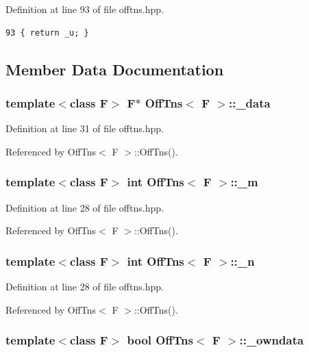 Definition at line 93 of file offtns.hpp.

\footnotesize\begin{verbatim}93 { return _u; }
\end{verbatim}\normalsize 




\subsection{Member Data Documentation}
\subsubsection{\setlength{\rightskip}{0pt plus 5cm}template$<$class F$>$ F$\ast$ {\bf Off\-Tns}$<$ F $>$::{\bf \_\-data}}\label{classOffTns_7125153abbcb2e949a1b4f81cbe22af5_7125153abbcb2e949a1b4f81cbe22af5}




Definition at line 31 of file offtns.hpp.

Referenced by Off\-Tns$<$ F $>$::Off\-Tns().
\subsubsection{\setlength{\rightskip}{0pt plus 5cm}template$<$class F$>$ int {\bf Off\-Tns}$<$ F $>$::{\bf \_\-m}}\label{classOffTns_b781ae81625400d76d94420d3af2c230_b781ae81625400d76d94420d3af2c230}




Definition at line 28 of file offtns.hpp.

Referenced by Off\-Tns$<$ F $>$::Off\-Tns().
\subsubsection{\setlength{\rightskip}{0pt plus 5cm}template$<$class F$>$ int {\bf Off\-Tns}$<$ F $>$::{\bf \_\-n}}\label{classOffTns_b628b96b5cc160f67acf6b4673cdd8bb_b628b96b5cc160f67acf6b4673cdd8bb}




Definition at line 28 of file offtns.hpp.

Referenced by Off\-Tns$<$ F $>$::Off\-Tns().
\subsubsection{\setlength{\rightskip}{0pt plus 5cm}template$<$class F$>$ bool {\bf Off\-Tns}$<$ F $>$::{\bf \_\-owndata}}\label{classOffTns_4a613b2956a4a0ffff962e497a5d56e0_4a613b2956a4a0ffff962e497a5d56e0}




